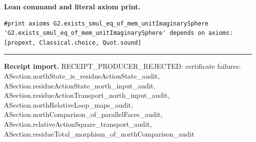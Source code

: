 \documentclass[11pt]{article}
\theoremstyle{plain}
\theoremstyle{definition}
\theoremstyle{remark}
\begin{document}
\begin{tcolorbox}
\par\smallskip\textbf{Lean command and literal axiom print.}
\begin{Verbatim}[breaklines=true,breakanywhere=true,fontsize=\small]
#print axioms G2.exists_smul_eq_of_mem_unitImaginarySphere
'G2.exists_smul_eq_of_mem_unitImaginarySphere' depends on axioms: [propext, Classical.choice, Quot.sound]
\end{Verbatim}
\medskip\hrule\medskip
\textbf{Receipt import.} \textcolor{KgtRed}{RECEIPT\_PRODUCER\_REJECTED: certificate failures: ASection.northState\_is\_residueActionState\_audit, ASection.residueActionState\_north\_input\_audit, ASection.residueActionTransport\_north\_input\_audit, ASection.northRelativeLoop\_maps\_audit, ASection.northComparison\_of\_parallelFaces\_audit, ASection.relativeActionSquare\_transport\_audit, ASection.residueTotal\_morphism\_of\_northComparison\_audit}
\end{tcolorbox}
\medskip
\end{document}
